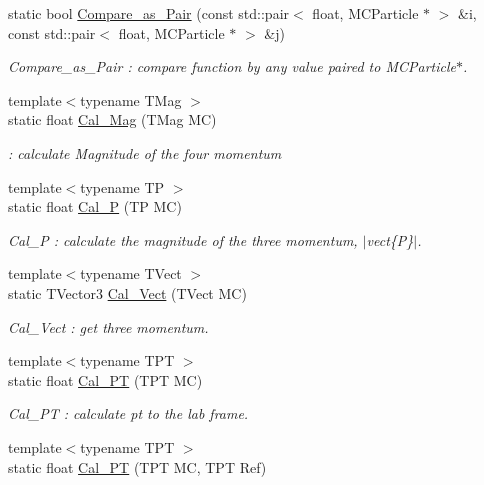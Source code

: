 \begin{DoxyCompactItemize}
static bool \hyperlink{classToolSet_1_1CMC_a9840196a2fd81836dfc4118e68d7be38}{Compare\_\-as\_\-Pair} (const std::pair$<$ float, MCParticle $\ast$ $>$ \&i, const std::pair$<$ float, MCParticle $\ast$ $>$ \&j)
\begin{DoxyCompactList}\small\item\em Compare\_\-as\_\-Pair : compare function by any value paired to MCParticle$\ast$. \item\end{DoxyCompactList}\item 
{\footnotesize template$<$typename TMag $>$ }\\static float \hyperlink{classToolSet_1_1CMC_acbada53a8416ca460d7aa07453610dc2}{Cal\_\-Mag} (TMag MC)
\begin{DoxyCompactList}\small\item\em : calculate Magnitude of the four momentum \item\end{DoxyCompactList}\item 
{\footnotesize template$<$typename TP $>$ }\\static float \hyperlink{classToolSet_1_1CMC_ae7f67f1180165cedcc4cbeb4e114e5d1}{Cal\_\-P} (TP MC)
\begin{DoxyCompactList}\small\item\em Cal\_\-P : calculate the magnitude of the three momentum, $|$vect\{P\}$|$. \item\end{DoxyCompactList}\item 
{\footnotesize template$<$typename TVect $>$ }\\static TVector3 \hyperlink{classToolSet_1_1CMC_a679d9af4f1004560f178ed10f1a3028c}{Cal\_\-Vect} (TVect MC)
\begin{DoxyCompactList}\small\item\em Cal\_\-Vect : get three momentum. \item\end{DoxyCompactList}\item 
{\footnotesize template$<$typename TPT $>$ }\\static float \hyperlink{classToolSet_1_1CMC_ac479ce63e1328c284ef104449b30d465}{Cal\_\-PT} (TPT MC)
\begin{DoxyCompactList}\small\item\em Cal\_\-PT : calculate pt to the lab frame. \item\end{DoxyCompactList}\item 
{\footnotesize template$<$typename TPT $>$ }\\static float \hyperlink{classToolSet_1_1CMC_a8c4c04395c95a6c513f049029c157a7d}{Cal\_\-PT} (TPT MC, TPT Ref)

\end{DoxyCompactItemize}
